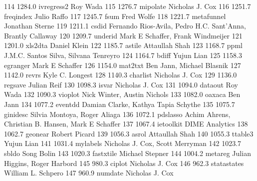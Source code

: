    114   1284.0    ivregress2    Roy Wada                                
   115   1276.7    mipolate      Nicholas J. Cox                         
   116   1251.7    freqindex     Julio Raffo                             
   117   1245.7    fsum          Fred Wolfe                              
   118   1221.7    metafunnel    Jonathan Sterne                         
   119   1211.1    csdid         Fernando Rios-Avila, Pedro H.C.         
                                   Sant'Anna, Brantly Callaway             
   120   1209.7    underid       Mark E Schaffer, Frank Windmeijer       
   121   1201.0    xls2dta       Daniel Klein                            
   122   1185.7    astile        Attaullah Shah                          
   123   1168.7    ppml          J.M.C. Santos Silva, Silvana Tenreyro   
   124   1164.7    bdiff         Yujun Lian                              
   125   1158.3    egranger      Mark E Schaffer                         
   126   1154.0    mat2txt       Ben Jann, Michael Blasnik               
   127   1142.0    revrs         Kyle C. Longest                         
   128   1140.3    charlist      Nicholas J. Cox                         
   129   1136.0    regsave       Julian Reif                             
   130   1098.3    isvar         Nicholas J. Cox                         
   131   1094.0    dataout       Roy Wada                                
   132   1090.3    vioplot       Nick Winter, Austin Nichols             
   133   1082.0    oaxaca        Ben Jann                                
   134   1077.2    eventdd       Damian Clarke, Kathya Tapia Schythe     
   135   1075.7    ginidesc      Silvia Montoya, Roger Aliaga            
   136   1072.1    pdslasso      Achim Ahrens, Christian B. Hansen, Mark 
                                   E Schaffer                              
   137   1067.4    ietoolkit     DIME Analytics                          
   138   1062.7    geonear       Robert Picard                           
   139   1056.3    asrol         Attaullah Shah                          
   140   1055.3    ttable3       Yujun Lian                              
   141   1031.4    mylabels      Nicholas J. Cox, Scott Merryman         
   142   1023.7    sbldo         Song Bolin                              
   143   1020.3    fastxtile     Michael Stepner                         
   144   1004.2    metareg       Julian Higgins, Roger Harbord           
   145    980.3    ciplot        Nicholas J. Cox                         
   146    962.3    statastates   William L. Schpero                      
   147    960.9    numdate       Nicholas J. Cox                         
